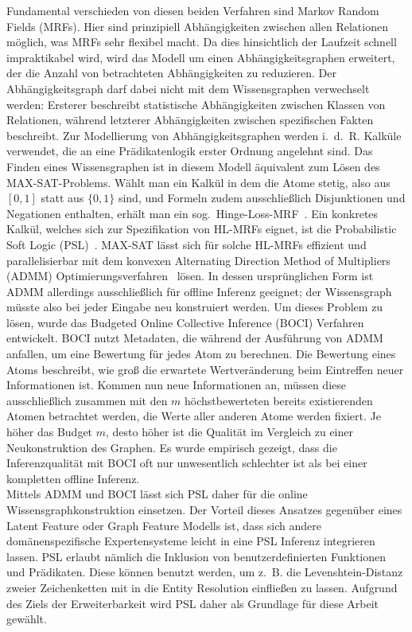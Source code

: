 \documentclass[11pt, a4paper]{scrreprt}
\begin{document}
Fundamental verschieden von diesen beiden Verfahren sind Markov Random Fields (MRFs).
Hier sind prinzipiell Abhängigkeiten zwischen allen Relationen möglich, was MRFs sehr flexibel macht.
Da dies hinsichtlich der Laufzeit schnell impraktikabel wird, wird das Modell um einen Abhängigkeitsgraphen erweitert, der die Anzahl von betrachteten Abhängigkeiten zu reduzieren.
Der Abhängigkeitsgraph darf dabei nicht mit dem Wissensgraphen verwechselt werden:
Ersterer beschreibt statistische Abhängigkeiten zwischen Klassen von Relationen, während letzterer Abhängigkeiten zwischen spezifischen Fakten beschreibt.
Zur Modellierung von Abhängigkeitsgraphen werden i.~d.~R. Kalküle verwendet, die an eine Prädikatenlogik erster Ordnung angelehnt sind.
Das Finden eines Wissensgraphen ist in diesem Modell äquivalent zum Lösen des MAX-SAT-Problems.
Wählt man ein Kalkül in dem die Atome stetig, also aus $[0, 1]$ statt aus $\{0, 1\}$ sind, und Formeln zudem ausschließlich Disjunktionen und Negationen enthalten, erhält man ein sog.\ Hinge-Loss-MRF~\cite{bach:2013}.
Ein konkretes Kalkül, welches sich zur Spezifikation von HL-MRFs eignet, ist die Probabilistic Soft Logic (PSL)~\cite{brocheler:2010}.
MAX-SAT lässt sich für solche HL-MRFs effizient und parallelisierbar mit dem konvexen Alternating Direction Method of Multipliers (ADMM) Optimierungsverfahren~\cite{boyd:2011} lösen.
In dessen ursprünglichen Form ist ADMM allerdings ausschließlich für offline Inferenz geeignet;
der Wissensgraph müsste also bei jeder Eingabe neu konstruiert werden.
Um dieses Problem zu lösen, wurde das Budgeted Online Collective Inference (BOCI) Verfahren~\cite{pujara:2015} entwickelt.
BOCI nutzt Metadaten, die während der Ausführung von ADMM anfallen, um eine Bewertung für jedes Atom zu berechnen.
Die Bewertung eines Atoms beschreibt, wie groß die erwartete Wertveränderung beim Eintreffen neuer Informationen ist.
Kommen nun neue Informationen an, müssen diese ausschließlich zusammen mit den $m$ höchstbewerteten bereits existierenden Atomen betrachtet werden, die Werte aller anderen Atome werden fixiert.
Je höher das Budget $m$, desto höher ist die Qualität im Vergleich zu einer Neukonstruktion des Graphen.
Es wurde empirisch gezeigt, dass die Inferenzqualität mit BOCI oft nur unwesentlich schlechter ist als bei einer kompletten offline Inferenz.\\

Mittels ADMM und BOCI lässt sich PSL daher für die online Wissensgraphkonstruktion einsetzen.
Der Vorteil dieses Ansatzes gegenüber eines Latent Feature oder Graph Feature Modells ist, dass sich andere domänenspezifische Expertensysteme leicht in eine PSL Inferenz integrieren lassen.
PSL erlaubt nämlich die Inklusion von benutzerdefinierten Funktionen und Prädikaten.
Diese können benutzt werden, um z.~B. die Levenshtein-Distanz zweier Zeichenketten mit in die Entity Resolution einfließen zu lassen.
Aufgrund des Ziels der Erweiterbarkeit wird PSL daher als Grundlage für diese Arbeit gewählt.
\end{document}

